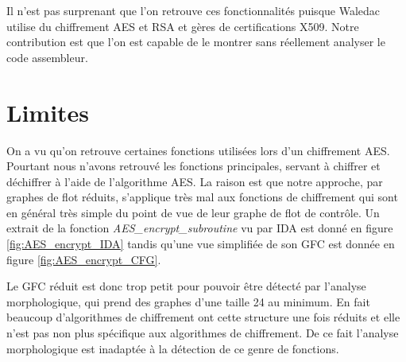 Il n'est pas surprenant que l'on retrouve ces fonctionnalités puisque Waledac utilise du chiffrement AES et RSA et gères de certifications X509. Notre contribution est que l'on est capable de le montrer sans réellement analyser le code assembleur.

\section{Limites}
On a vu qu'on retrouve certaines fonctions utilisées lors d'un chiffrement AES.
Pourtant nous n'avons retrouvé les fonctions principales, servant à chiffrer et déchiffrer à l'aide de l'algorithme AES.
La raison est que notre approche, par graphes de flot réduits, s'applique très mal aux fonctions de chiffrement qui sont en général très simple du point de vue de leur graphe de flot de contrôle.
Un extrait de la fonction \emph{AES\_encrypt\_subroutine} vu par IDA est donné en figure \ref{fig:AES_encrypt_IDA} tandis qu'une vue simplifiée de son GFC est donnée en figure \ref{fig:AES_encrypt_CFG}.

\begin{figure}[h]
\begin{center}
\end{center}
\end{figure}

Le GFC réduit est donc trop petit pour pouvoir être détecté par l'analyse morphologique, qui prend des graphes d'une taille 24 au minimum.
En fait beaucoup d'algorithmes de chiffrement ont cette structure une fois réduits et elle n'est pas non plus spécifique aux algorithmes de chiffrement. De ce fait l'analyse morphologique est inadaptée à la détection de ce genre de fonctions.
